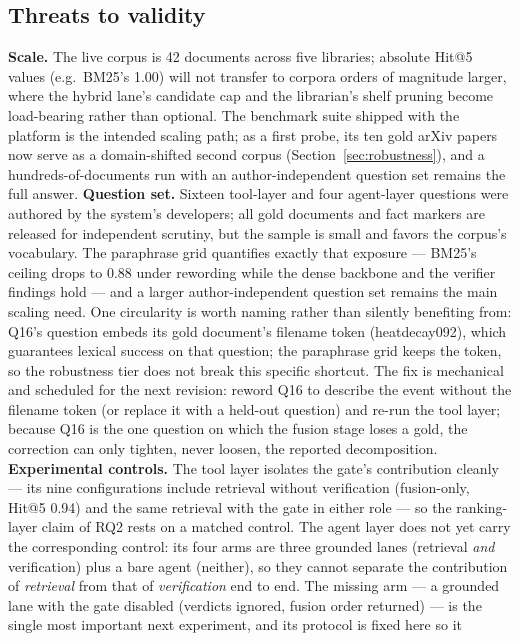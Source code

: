 \documentclass[preprint,12pt]{elsarticle}
\begin{document}
\subsection{Threats to validity}
\label{sec:threats}
\textbf{Scale.} The live corpus is 42 documents across five libraries;
absolute Hit@5 values (e.g.\ BM25's 1.00) will not transfer to corpora
orders of magnitude larger, where the hybrid lane's candidate cap and the
librarian's shelf pruning become load-bearing rather than optional. The
benchmark suite shipped with the platform is the intended scaling path;
as a first probe, its ten gold arXiv papers now serve as a domain-shifted
second corpus (Section~\ref{sec:robustness}), and a
hundreds-of-documents run with an author-independent question set remains
the full answer.
\textbf{Question set.} Sixteen tool-layer and four agent-layer questions
were authored by the system's developers; all gold documents and fact
markers are released for independent scrutiny, but the sample is small and
favors the corpus's vocabulary. The paraphrase grid quantifies exactly
that exposure --- BM25's ceiling drops to 0.88 under rewording while the
dense backbone and the verifier findings hold --- and a larger
author-independent question set remains the main scaling need. One
circularity is worth naming rather than silently benefiting from: Q16's
question embeds its gold document's filename token (heatdecay092), which
guarantees lexical success on that question; the paraphrase grid keeps
the token, so the robustness tier does not break this specific shortcut. The
fix is mechanical and scheduled for the next revision: reword Q16 to describe
the event without the filename token (or replace it with a held-out question)
and re-run the tool layer; because Q16 is the one question on which the fusion
stage loses a gold, the correction can only tighten, never loosen, the
reported decomposition.
\textbf{Experimental controls.} The tool layer isolates the gate's
contribution cleanly --- its nine configurations include retrieval without
verification (fusion-only, Hit@5 0.94) and the same retrieval with the gate in
either role --- so the ranking-layer claim of RQ2 rests on a matched control.
The agent layer does not yet carry the corresponding control: its four arms
are three grounded lanes (retrieval \emph{and} verification) plus a bare agent
(neither), so they cannot separate the contribution of \emph{retrieval} from
that of \emph{verification} end to end. The missing arm --- a grounded lane
with the gate disabled (verdicts ignored, fusion order returned) --- is the
single most important next experiment, and its protocol is fixed here so it
\end{document}
